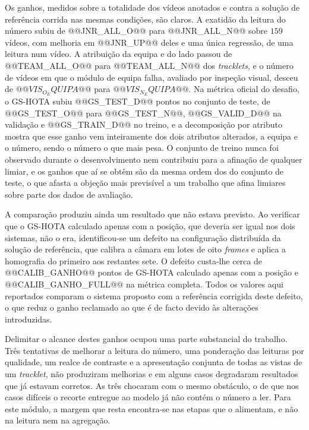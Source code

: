 Os ganhos, medidos sobre a totalidade dos vídeos anotados e contra a solução de referência corrida
nas mesmas condições, são claros. A exatidão da leitura do número subiu de @@JNR_ALL_O@@ para
@@JNR_ALL_N@@ sobre $159$ vídeos, com melhoria em @@JNR_UP@@ deles e uma única regressão, de uma
leitura num vídeo. A atribuição da equipa e do lado passou de @@TEAM_ALL_O@@ para @@TEAM_ALL_N@@ dos
\emph{tracklets}, e o número de vídeos em que o módulo de equipa falha, avaliado por inspeção
visual, desceu de $@@VIS_O_EQUIPA@@$ para $@@VIS_N_EQUIPA@@$. Na métrica oficial do desafio, o
GS-HOTA subiu @@GS_TEST_D@@ pontos no conjunto de teste, de @@GS_TEST_O@@ para @@GS_TEST_N@@,
@@GS_VALID_D@@ na validação e @@GS_TRAIN_D@@ no treino, e a decomposição por atributo mostra que
esse ganho vem inteiramente dos dois atributos alterados, a equipa e o número, sendo o número o que
mais pesa. O conjunto de treino nunca foi observado durante o desenvolvimento nem contribuiu para a
afinação de qualquer limiar, e os ganhos que aí se obtêm são da mesma ordem dos do conjunto de
teste, o que afasta a objeção mais previsível a um trabalho que afina limiares sobre parte dos dados
de avaliação.

A comparação produziu ainda um resultado que não estava previsto. Ao verificar que o GS-HOTA
calculado apenas com a posição, que deveria ser igual nos dois sistemas, não o era, identificou-se
um defeito na configuração distribuída da solução de referência, que calibra a câmara em lotes de
oito \emph{frames} e aplica a homografia do primeiro aos restantes sete. O defeito custa-lhe cerca
de @@CALIB_GANHO@@ pontos de GS-HOTA calculado apenas com a posição e @@CALIB_GANHO_FULL@@ na métrica
completa. Todos os valores aqui reportados comparam o sistema proposto
com a referência corrigida deste defeito, o que reduz o ganho reclamado ao que é de facto devido às
alterações introduzidas.

Delimitar o alcance destes ganhos ocupou uma parte substancial do trabalho. Três tentativas de
melhorar a leitura do número, uma ponderação das leituras por qualidade, um realce de contraste e a
apresentação conjunta de todas as vistas de um \emph{tracklet}, não produziram melhorias e em alguns
casos degradaram resultados que já estavam corretos. As três chocaram com o mesmo obstáculo, o de
que nos casos difíceis o recorte entregue ao modelo já não contém o número a ler. Para este módulo,
a margem que resta encontra-se nas etapas que o alimentam, e não na leitura nem na agregação.

